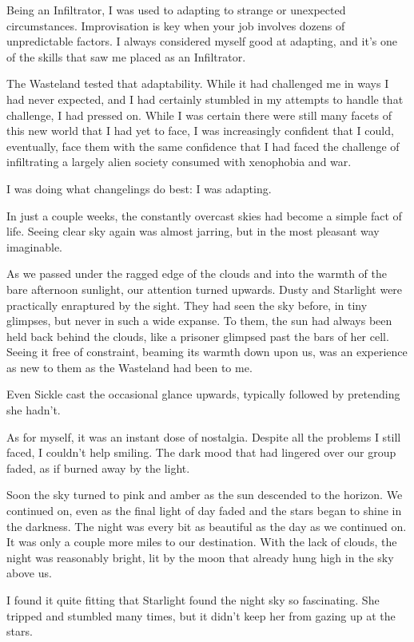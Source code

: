 Being an Infiltrator, I was used to adapting to strange or unexpected circumstances. Improvisation is key when your job involves dozens of unpredictable factors. I always considered myself good at adapting, and it’s one of the skills that saw me placed as an Infiltrator.

The Wasteland tested that adaptability. While it had challenged me in ways I had never expected, and I had certainly stumbled in my attempts to handle that challenge, I had pressed on. While I was certain there were still many facets of this new world that I had yet to face, I was increasingly confident that I could, eventually, face them with the same confidence that I had faced the challenge of infiltrating a largely alien society consumed with xenophobia and war.

I was doing what changelings do best: I was adapting.

In just a couple weeks, the constantly overcast skies had become a simple fact of life. Seeing clear sky again was almost jarring, but in the most pleasant way imaginable.

As we passed under the ragged edge of the clouds and into the warmth of the bare afternoon sunlight, our attention turned upwards. Dusty and Starlight were practically enraptured by the sight. They had seen the sky before, in tiny glimpses, but never in such a wide expanse. To them, the sun had always been held back behind the clouds, like a prisoner glimpsed past the bars of her cell. Seeing it free of constraint, beaming its warmth down upon us, was an experience as new to them as the Wasteland had been to me.

Even Sickle cast the occasional glance upwards, typically followed by pretending she hadn’t.

As for myself, it was an instant dose of nostalgia. Despite all the problems I still faced, I couldn’t help smiling. The dark mood that had lingered over our group faded, as if burned away by the light.

Soon the sky turned to pink and amber as the sun descended to the horizon. We continued on, even as the final light of day faded and the stars began to shine in the darkness. The night was every bit as beautiful as the day as we continued on. It was only a couple more miles to our destination. With the lack of clouds, the night was reasonably bright, lit by the moon that already hung high in the sky above us.

I found it quite fitting that Starlight found the night sky so fascinating. She tripped and stumbled many times, but it didn’t keep her from gazing up at the stars.


